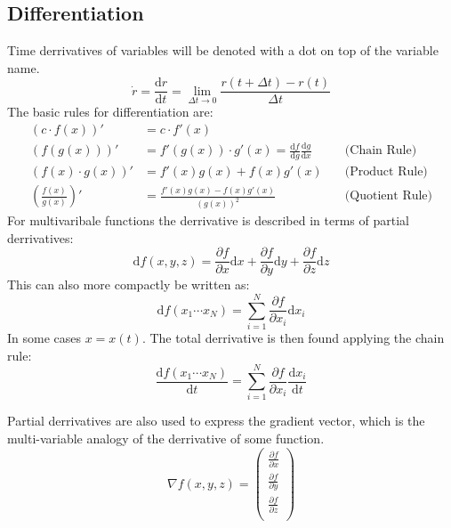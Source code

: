 \documentclass[11pt, a4paper]{article}
\renewcommand*{\d}{\text{d}}
\begin{document}
\subsection{Differentiation}
Time derrivatives of variables will be denoted with a dot on top of the variable name.
\begin{equation*}
  \dot{r} = \frac{\d r}{\d t} = \lim_{\Delta t \to 0} \frac{r(t + \Delta t) - r(t)}{\Delta t}
\end{equation*}
The basic rules for differentiation are:
\begin{align*}
  (c \cdot f(x))' &= c \cdot f'(x) &\\
  (f(g(x)))' &= f'(g(x)) \cdot g'(x) = \frac{\d f}{\d g} \frac{\d g}{\d x} \quad &\text{(Chain Rule)}\\ 
  (f(x) \cdot g(x))' &= f'(x)g(x) + f(x)g'(x) \quad &\text{(Product Rule)}\\
  \left( \frac{f(x)}{g(x)} \right)' &= \frac{f'(x)g(x) - f(x)g'(x)}{(g(x))^2} \quad &\text{(Quotient Rule)}
\end{align*}
For multivaribale functions the derrivative is described in terms of partial derrivatives:
\begin{equation*}
  \d f(x, y, z) = \frac{\partial f}{\partial x}\d x + \frac{\partial f}{\partial y}\d y + \frac{\partial f}{\partial z}\d z
\end{equation*}
This can also more compactly be written as:
\begin{equation*}
  \d f(x_1 \cdots x_N) = \sum_{i=1}^{N} \frac{\partial f}{\partial x_i}\d x_i
\end{equation*}
In some cases $x = x(t)$. The total derrivative is then found applying the chain rule:
\begin{equation*}
  \frac{\d f(x_1 \cdots x_N)}{\d t} = \sum_{i=1}^{N} \frac{\partial f}{\partial x_i} \frac{\d x_i}{\d t}
\end{equation*}

Partial derrivatives are also used to express the gradient vector, which is the multi-variable analogy of the derrivative of some function.
\begin{equation*}
  \nabla f(x, y, z) =
  \begin{pmatrix}
    \frac{\partial f}{\partial x}\\
    \frac{\partial f}{\partial y}\\
    \frac{\partial f}{\partial z}\\
  \end{pmatrix}
\end{equation*}
\end{document}
